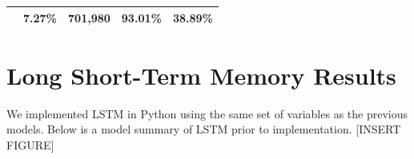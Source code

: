 \documentclass[12pt,oneside]{chicagocapstone}
\begin{document}
\begin{longtable}[]{@{}ccccc@{}}
\begin{minipage}[t]{0.27\columnwidth}
\end{minipage} & \begin{minipage}[t]{0.13\columnwidth}\centering\strut
7.27\%\strut
\end{minipage} & \begin{minipage}[t]{0.14\columnwidth}\centering\strut
701,980\strut
\end{minipage} & \begin{minipage}[t]{0.16\columnwidth}\centering\strut
93.01\%\strut
\end{minipage} & \begin{minipage}[t]{0.16\columnwidth}\centering\strut
38.89\%\strut
\end{minipage}\tabularnewline
\bottomrule
\end{longtable}
\section*{Long Short-Term Memory
Results}\label{long-short-term-memory-results}

We implemented LSTM in Python using the same set of variables as the
previous models. Below is a model summary of LSTM prior to
implementation. {[}INSERT FIGURE{]}
\end{document}
